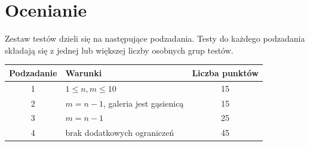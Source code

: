 \documentclass[10pt]{article}
\begin{document}

    \section*{Ocenianie}
        
    Zestaw testów dzieli się na następujące podzadania. Testy do każdego podzadania składają się z jednej lub większej liczby osobnych grup testów.
    
    \begin{center}
        \begin{tabular}{ |c|p{9cm}|c| }
            \hline
            \textbf{Podzadanie} & \textbf{Warunki} & \textbf{Liczba punktów}\\
            \hline
            1 & $1\leq n, m\leq 10$ & 15\\
            \hline
            2 & $m = n-1$, galeria jest gąsienicą\footnotemark & 15\\
            \hline
            3 & $m = n-1$ & 25\\
            \hline
            4 & brak dodatkowych ograniczeń & 45\\
            \hline
        \end{tabular}
    \end{center}
    
\end{document}
